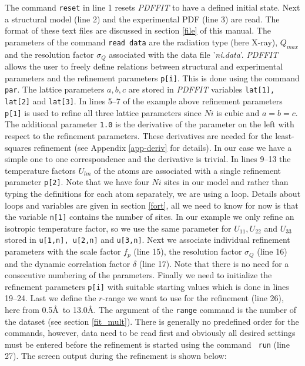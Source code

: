 \noindent The command {\tt reset} in line 1 resets {\it PDFFIT} to
have a defined initial state. Next a structural model (line 2) and
the experimental PDF (line 3) are read. The format of these text
files are discussed in section \ref{file} of this manual. The
parameters of the command {\tt read data} are the radiation type
(here X-ray), $Q_{max}$ and the resolution factor $\sigma_{Q}$
associated with the data file '{\it ni.data}'. {\it PDFFIT} allows
the user to freely define relations between structural and
experimental parameters and the refinement parameters {\tt p[i]}.
This is done using the command {\tt par}. The lattice parameters
$a,b,c$ are stored in {\it PDFFIT} variables {\tt lat[1], lat[2]}
and {\tt lat[3]}. In lines 5--7 of the example above refinement
parameters {\tt p[1]} is used to refine all three lattice
parameters since $Ni$ is cubic and $a=b=c$. The additional
parameter {\tt 1.0} is the derivative of the parameter on the left
with respect to the refinement parameters. These derivatives are
needed for the least-squares refinement (see Appendix
\ref{app-deriv} for details). In our case we have a simple one to
one correspondence and the derivative is trivial. In lines 9--13
the temperature factors $U_{lm}$ of the atoms are associated with
a single refinement parameter {\tt p[2]}. Note that we have four
$Ni$ sites in our model and rather than typing the definitions for
each atom separately, we are using a loop. Details about loops and
variables are given in section \ref{fort}, all we need to know for
now is that the variable {\tt n[1]} contains the number of sites.
In our example we only refine an isotropic temperature factor, so
we use the same parameter for $U_{11}, U_{22}$ and $U_{33}$ stored
in {\tt u[1,n], u[2,n]} and {\tt u[3,n]}. Next we associate
individual refinement parameters with the scale factor $f_{p}$
(line 15), the resolution factor $\sigma_{Q}$ (line 16) and the
dynamic correlation factor $\delta$ (line 17). Note that there is
no need for a consecutive numbering of the parameters. Finally we
need to initialize the refinement parameters {\tt p[i]} with
suitable starting values which is done in lines 19--24. Last we
define the $r$-range we want to use for the refinement (line 26),
here from 0.5\AA\ to 13.0\AA. The argument of the {\tt range}
command is the number of the dataset (see section \ref{fit_mult}).
There is generally no predefined order for the commands, however,
data need to be read first and obviously all desired settings must
be entered before the refinement is started using the command {\tt
run} (line 27). The screen output during the refinement is shown
below:

